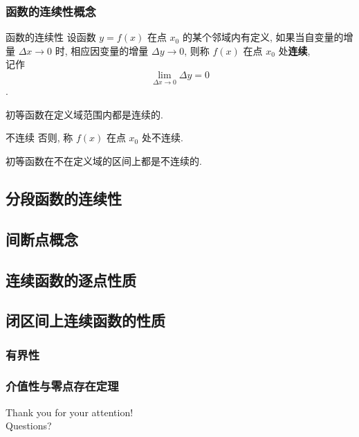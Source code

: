 \documentclass[
10pt, 
aspectratio=43, 
]{beamer}
\begin{document}
\begin{frame}
\frametitle{函数的连续性概念}
\begin{block}{函数的连续性}
 设函数 $y=f(x)$ 在点 $x_0$ 的某个邻域内有定义,  如果当自变量的增量 $\Delta x \rightarrow 0$ 时,  相应因变量的增量 $\Delta y \rightarrow 0$,  则称 $f(x)$ 在点 $x_0$ 处\textbf{连续}, \\
 记作 $$\lim _{\Delta x \rightarrow 0} \Delta y=0$$. 
\end{block}
\pause
初等函数在定义域范围内都是连续的. 
\pause
\begin{exampleblock}{不连续}
否则,  称 $f(x)$ 在点 $x_0$ 处不连续. 
\end{exampleblock}
\pause
初等函数在不在定义域的区间上都是不连续的. 
\end{frame}



\subsection{分段函数的连续性}
\subsection{间断点概念}
\subsection{连续函数的逐点性质}
\subsection{闭区间上连续函数的性质}
\subsubsection{有界性}
\subsubsection{介值性与零点存在定理}




\begin{frame}[plain]
	\vfill
	\centering
	{
		\centering \Huge \color{white} Thank you for your attention!\\[10pt]Questions?
	}
	\vfill
\end{frame}
\end{document}
